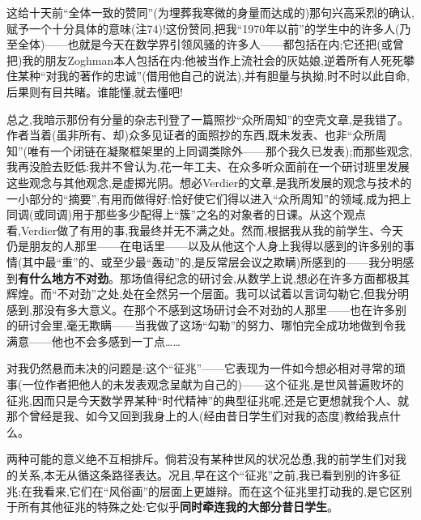 这给十天前“全体一致的赞同”(为埋葬我寒微的身量而达成的)那句兴高采烈的确认,赋予一个十分具体的意味(注74)!这份赞同,把我“1970年以前”的学生中的许多人(乃至全体)——也就是今天在数学界引领风骚的许多人——都包括在内;它还把(或曾把)我的朋友Zoghman本人包括在内:他被当作上流社会的灰姑娘,逆着所有人死死攀住某种“对我的著作的忠诚”(借用他自己的说法),并有胆量与执拗,时不时以此自命,后果则有目共睹。谁能懂,就去懂吧!

总之,我暗示那份有分量的杂志刊登了一篇照抄“众所周知”的空壳文章,是我错了。作者当着(虽非所有、却)众多见证者的面照抄的东西,既未发表、也非“众所周知”(唯有一个闭链在凝聚框架里的上同调类除外——那个我久已发表);而那些观念,我再没脸去贬低:我并不曾认为,花一年工夫、在众多听众面前在一个研讨班里发展这些观念与其他观念,是虚掷光阴。想必Verdier的文章,是我所发展的观念与技术的一小部分的“摘要”,有用而做得好:恰好使它们得以进入“众所周知”的领域,成为把上同调(或同调)用于那些多少配得上“簇”之名的对象者的日课。\dmark{}从这个观点看,Verdier做了有用的事,我最终并无不满之处。然而,根据我从我的前学生、今天仍是朋友的人那里——在电话里——以及从他这个人身上我得以感到的许多别的事情(其中最“重”的、或至少最“轰动”的,是反常层会议之欺瞒)所感到的——我分明感到\textbf{有什么地方不对劲}。那场值得纪念的研讨会,从数学上说,想必在许多方面都极其辉煌。而“不对劲”之处,处在全然另一个层面。我可以试着以言词勾勒它,但我分明感到,那没有多大意义。在那个不感到这场研讨会不对劲的人那里——也在许多别的研讨会里,毫无欺瞒——当我做了这场“勾勒”的努力、哪怕完全成功地做到令我满意——他也不会多感到一丁点……

对我仍然悬而未决的问题是:这个“征兆”——它表现为一件如今想必相对寻常的琐事(一位作者把他人的未发表观念呈献为自己的)——这个征兆,是世风普遍败坏的征兆,因而只是今天数学界某种“时代精神”的典型征兆呢,还是它更想就我个人、就那个曾经是我、如今又回到我身上的人(经由昔日学生们对我的态度)教给我点什么。

两种可能的意义绝不互相排斥。倘若没有某种世风的状况怂恿,我的前学生们对我的关系,本无从循这条路径表达。况且,早在这个“征兆”之前,我已看到别的许多征兆;在我看来,它们在“风俗画”的层面上更雄辩。而在这个征兆里打动我的,是它区别于所有其他征兆的特殊之处:它似乎\textbf{同时牵连我的大部分昔日学生}。

